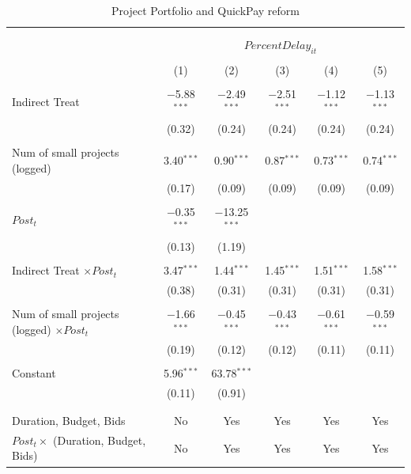 \documentclass[
]{article}
\begin{document}
\begin{table}[H] \centering 
  \caption{Project Portfolio and QuickPay reform} 
  \label{} 
\small 
\begin{tabular}{@{\extracolsep{-10pt}}lccccc} 
\\[-1.8ex]\hline 
\hline \\[-1.8ex] 
\\[-1.8ex] & \multicolumn{5}{c}{$PercentDelay_{it}$} \\ 
\\[-1.8ex] & (1) & (2) & (3) & (4) & (5)\\ 
\hline \\[-1.8ex] 
 Indirect Treat & $-$5.88$^{***}$ & $-$2.49$^{***}$ & $-$2.51$^{***}$ & $-$1.12$^{***}$ & $-$1.13$^{***}$ \\ 
  & (0.32) & (0.24) & (0.24) & (0.24) & (0.24) \\ 
  & & & & & \\ 
 Num of small projects (logged) & 3.40$^{***}$ & 0.90$^{***}$ & 0.87$^{***}$ & 0.73$^{***}$ & 0.74$^{***}$ \\ 
  & (0.17) & (0.09) & (0.09) & (0.09) & (0.09) \\ 
  & & & & & \\ 
 $Post_t$ & $-$0.35$^{***}$ & $-$13.25$^{***}$ &  &  &  \\ 
  & (0.13) & (1.19) &  &  &  \\ 
  & & & & & \\ 
 Indirect Treat $\times Post_t$ & 3.47$^{***}$ & 1.44$^{***}$ & 1.45$^{***}$ & 1.51$^{***}$ & 1.58$^{***}$ \\ 
  & (0.38) & (0.31) & (0.31) & (0.31) & (0.31) \\ 
  & & & & & \\ 
 Num of small projects (logged) $\times Post_t$ & $-$1.66$^{***}$ & $-$0.45$^{***}$ & $-$0.43$^{***}$ & $-$0.61$^{***}$ & $-$0.59$^{***}$ \\ 
  & (0.19) & (0.12) & (0.12) & (0.11) & (0.11) \\ 
  & & & & & \\ 
 Constant & 5.96$^{***}$ & 63.78$^{***}$ &  &  &  \\ 
  & (0.11) & (0.91) &  &  &  \\ 
  & & & & & \\ 
\hline \\[-1.8ex] 
Duration, Budget, Bids & No & Yes & Yes & Yes & Yes \\ 
$Post_t \times $  (Duration, Budget, Bids) & No & Yes & Yes & Yes & Yes \\ 

\end{tabular}
\end{table}
\end{document}

